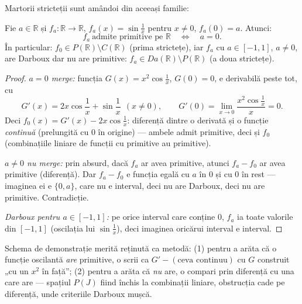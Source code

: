 Martorii stricteții sunt amândoi din aceeași familie:

\begin{teorema}
Fie $a\in\mathbb{R}$ și $f_a:\mathbb{R}\to\mathbb{R}$, $f_a(x)=\sin\frac1x$ pentru $x\neq0$, $f_a(0)=a$. Atunci:
\[
f_a\ \text{admite primitive pe }\mathbb{R}\quad\Longleftrightarrow\quad a=0.
\]
În particular: $f_0\in P(\mathbb{R})\setminus C(\mathbb{R})$ (prima strictețe), iar $f_a$ cu $a\in[-1,1]$, $a\neq0$, are Darboux dar nu are primitive: $f_a\in Da(\mathbb{R})\setminus P(\mathbb{R})$ (a doua strictețe).
\end{teorema}
\begin{proof}
\emph{$a=0$ merge:} funcția $G(x)=x^2\cos\frac1x$, $G(0)=0$, e derivabilă peste tot, cu
\[
G'(x)=2x\cos\frac1x+\sin\frac1x\ \ (x\neq0),\qquad G'(0)=\lim_{x\to0}\frac{x^2\cos\frac1x}{x}=0.
\]
Deci $f_0(x)=G'(x)-2x\cos\frac1x$: diferență dintre o derivată și o funcție \emph{continuă} (prelungită cu $0$ în origine) --- ambele admit primitive, deci și $f_0$ (combinațiile liniare de funcții cu primitive au primitive).

\emph{$a\neq0$ nu merge:} prin absurd, dacă $f_a$ ar avea primitive, atunci $f_a-f_0$ ar avea primitive (diferență). Dar $f_a-f_0$ e funcția egală cu $a$ în $0$ și cu $0$ în rest --- imaginea ei e $\{0,a\}$, care nu e interval, deci nu are Darboux, deci nu are primitive. Contradicție.

\emph{Darboux pentru $a\in[-1,1]$:} pe orice interval care conține $0$, $f_a$ ia toate valorile din $[-1,1]$ (oscilația lui $\sin\frac1x$), deci imaginea oricărui interval e interval.
\end{proof}

\begin{obs}
Schema de demonstrație merită reținută ca metodă: (1) pentru a arăta că o funcție oscilantă \emph{are} primitive, o scrii ca $G'-(\text{ceva continuu})$ cu $G$ construit „cu un $x^2$ în față''; (2) pentru a arăta că \emph{nu} are, o compari prin diferență cu una care are --- spațiul $P(J)$ fiind închis la combinații liniare, obstrucția cade pe diferență, unde criteriile Darboux mușcă.
\end{obs}

